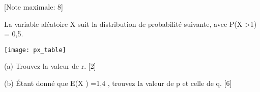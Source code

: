 \begin{question}
  \hspace*{\fill} [Note maximale: 8]\par
  \medskip
  \noindent La variable aléatoire X suit la distribution de probabilité suivante, avec P(X >1) = 0,5.\par

  \texttt{[image: px\_table]}  

  (a) Trouvez la valeur de r.\hspace*{\fill} [2]\par
  (b) Étant donné que E(X ) =1,4 , trouvez la valeur de p et celle de q. \hspace*{\fill} [6]\par
  
\end{question}

